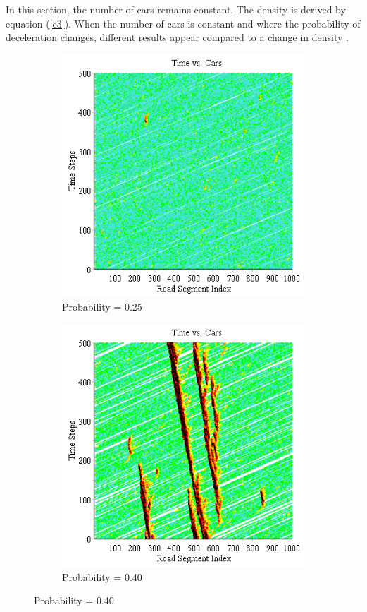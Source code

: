 \documentclass[12pt]{extarticle}
\begin{document}
In this section, the number of cars remains constant. The density is derived by equation (\ref{e3}). When the number of cars is constant and where the probability of deceleration changes, different results appear compared to a change in density .
\begin{figure}[h!]
	\caption{Roads = 1,000, Cars = 100}
	\begin{subfigure}{0.50\textwidth}
		\includegraphics[scale=0.50]{Graph5.png}
		\caption{Probability = 0.25}
		\label{fig:img5}
	\end{subfigure}
	\begin{subfigure}{0.50\textwidth}
		\includegraphics[scale=0.50]{Graph6.png}
		\caption{Probability = 0.40}
		\label{fig:img6}
	\end{subfigure}
\end{figure}
\end{document}
